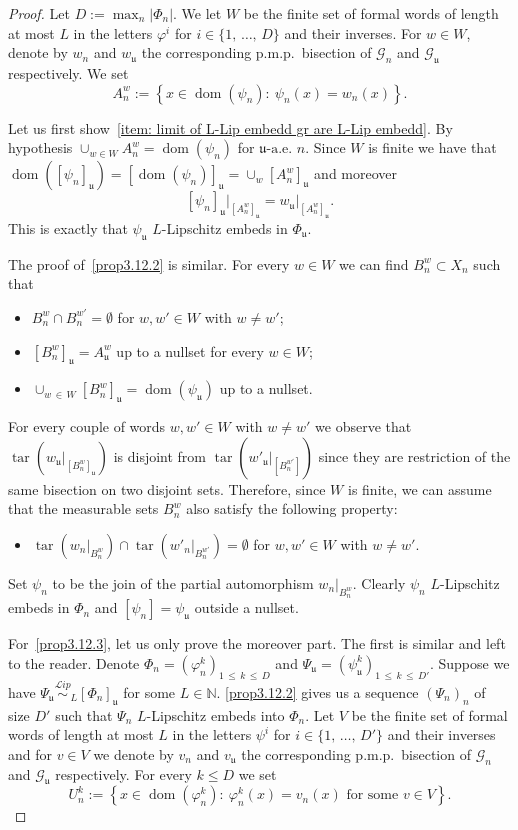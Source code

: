 \documentclass[10pt]{amsart}
\theoremstyle{definition}
\newcommand{\Nmath}{\mathbb{N}}
\newcommand{\cg}{\mathcal{G}}
\DeclareMathOperator{\dom}{dom}
\DeclareMathOperator{\tar}{tar}
\newcommand{\ul}{\mathfrak{u}}
\newcommand{\ulae}{\mathfrak{u}\textrm{-a.e. }n}
\newcommand{\ph}{\varphi}
\newcommand{\pmp}{p.m.p.\ }
\newcommand\Lipeq{\overset{\mathcal{L}ip}{\sim}}
\begin{document}
\begin{proof}
Let $D:=\max_n |\Phi_n|$. We let $W$ be the finite set of formal words of length at most $L$ in the letters $\ph^i$ for $i\in \{1,\,\ldots,\,D\}$ and their inverses. For $w\in W$, denote by $w_n$ and $w_{\ul}$ the corresponding \pmp bisection of $\cg_n$ and $\cg_\ul$ respectively. We set
\[
A_n^w:=\left\{x\in \dom(\psi_n):\ \psi_n(x)=w_n(x)\right\}.
\]

Let us first show~\eqref{item: limit of L-Lip embedd gr are L-Lip embedd}. By hypothesis $\cup_{w\in W}A_n^w=\dom(\psi_n)$ for $\ulae$. Since $W$ is finite we have that $\dom([\psi_n]_\ul)=[\dom(\psi_n)]_\ul=\cup_w [A_n^w]_\ul$ and moreover
\[
[\psi_n]_\ul\bigr|_{\left[A_n^w\right]_\ul}=w_\ul\bigr|_{\left[A_n^w\right]_\ul}.
\]
This is exactly that $\psi_\ul$ $L$-Lipschitz embeds in $\Phi_\ul$.

The proof of~\eqref{prop3.12.2} is similar. For every $w\in W$ we can find $B_n^w\subset X_n$ such that
\begin{itemize}
\item $B_n^w\cap B_n^{w'}=\emptyset$ for $w,w'\in W$ with $w\neq w'$;
\item $[B_n^w]_\ul= A^w_\ul$ up to a nullset for every $w\in W$;
\item $\cup_{w\,\in\,W} [B_n^w]_\ul=\dom(\psi_\ul)$ up to a nullset.
\end{itemize}
For every couple of words $w,w'\in W$ with $w\neq w'$ we observe that $\tar(w_\ul|_{[B_n^w]_\ul})$ is disjoint from $\tar(w'_\ul|_{[B_n^{w'}]})$ since they are restriction of the same bisection on two disjoint sets. Therefore, since $W$ is finite, we can assume that the measurable sets $B_n^w$ also satisfy the following property:
\begin{itemize}
\item $\tar\left(w_n\bigr|_{B_n^w}\right)\cap\tar\left(w'_n\bigr|_{B_n^{w'}}\right) =\emptyset$ for $w,w'\in W$ with $w\neq w'$.
\end{itemize}

Set $\psi_n$ to be the join of the partial automorphism $w_n\bigr|_{B_n^w}$. Clearly $\psi_n$ $L$-Lipschitz embeds in $\Phi_n$ and $[\psi_n]=\psi_\ul$ outside a nullset.

For~\eqref{prop3.12.3}, let us only prove the moreover part. The first is similar and left to the reader. Denote $\Phi_n = (\ph_n^k)_{1\,\leq\,k\,\leq\, D}$ and $\Psi_\ul = (\psi_\ul^k)_{1\,\leq\,k\,\leq\,D'}$. Suppose we have $\Psi_\ul\Lipeq_L [\Phi_n]_\ul$ for some $L\in\Nmath$. \eqref{prop3.12.2} gives us a sequence $(\Psi_n)_n$ of size $D'$ such that $\Psi_n$ $L$-Lipschitz embeds into $\Phi_n$. Let $V$ be the finite set of formal words of length at most $L$ in the letters $\psi^i$ for $i\in \{1,\,\ldots,\,D'\}$ and their inverses and for $v\in V$ we denote by $v_n$ and $v_{\ul}$ the corresponding \pmp bisection of $\cg_n$ and $\cg_\ul$ respectively. For every $k \leq D$ we set
\[
U^k_n:=\left\{x\in\dom\left(\ph^k_n\right):\ \ph^k_n(x)=v_n(x)\text{ for some }v\in V\right\}.
\]


\end{proof}
\end{document}
